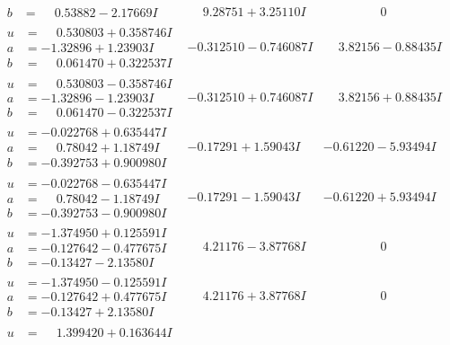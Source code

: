 \documentclass[1p]{elsarticle_modified}
\theoremstyle{definition}
\begin{document}
$$\begin{array}{c|c|c}
\begin{aligned}
b &= \phantom{-}0.53882 - 2.17669 I\end{aligned}
 & \phantom{-}9.28751 + 3.25110 I & \phantom{-0.000000 } 0 \\ \hline\begin{aligned}
u &= \phantom{-}0.530803 + 0.358746 I \\
a &= -1.32896 + 1.23903 I \\
b &= \phantom{-}0.061470 + 0.322537 I\end{aligned}
 & -0.312510 - 0.746087 I & \phantom{-}3.82156 - 0.88435 I \\ \hline\begin{aligned}
u &= \phantom{-}0.530803 - 0.358746 I \\
a &= -1.32896 - 1.23903 I \\
b &= \phantom{-}0.061470 - 0.322537 I\end{aligned}
 & -0.312510 + 0.746087 I & \phantom{-}3.82156 + 0.88435 I \\ \hline\begin{aligned}
u &= -0.022768 + 0.635447 I \\
a &= \phantom{-}0.78042 + 1.18749 I \\
b &= -0.392753 + 0.900980 I\end{aligned}
 & -0.17291 + 1.59043 I & -0.61220 - 5.93494 I \\ \hline\begin{aligned}
u &= -0.022768 - 0.635447 I \\
a &= \phantom{-}0.78042 - 1.18749 I \\
b &= -0.392753 - 0.900980 I\end{aligned}
 & -0.17291 - 1.59043 I & -0.61220 + 5.93494 I \\ \hline\begin{aligned}
u &= -1.374950 + 0.125591 I \\
a &= -0.127642 - 0.477675 I \\
b &= -0.13427 - 2.13580 I\end{aligned}
 & \phantom{-}4.21176 - 3.87768 I & \phantom{-0.000000 } 0 \\ \hline\begin{aligned}
u &= -1.374950 - 0.125591 I \\
a &= -0.127642 + 0.477675 I \\
b &= -0.13427 + 2.13580 I\end{aligned}
 & \phantom{-}4.21176 + 3.87768 I & \phantom{-0.000000 } 0 \\ \hline\begin{aligned}
u &= \phantom{-}1.399420 + 0.163644 I \\

\end{aligned}
\end{array}$$
\end{document}
